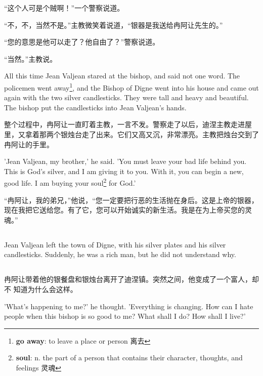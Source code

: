 \documentclass[fontset=ubuntu, zihao=5]{ctexart}
\begin{document}
\begin{paracol}{2}
  “这个人可是个贼啊！”一个警察说道。

  “不，不，当然不是。”主教微笑着说道，“银器是我送给冉阿让先生的。”

  “您的意思是他可以走了？他自由了？”警察说道。

  “当然。”主教说。

  \switchcolumn*

  All this time Jean Valjean stared at the bishop, and said not one word. The policemen went away\footnote{\textbf{go away}: to leave a place or person 离去}, and the Bishop of Digne went into his house and came out again with the two silver candlesticks. They were tall and heavy and beautiful. The bishop put the candlesticks into Jean Valjean's hands.

  \switchcolumn
  整个过程中，冉阿让一直盯着主教，一言不发。警察走了以后，迪涅主教走进屋里，又拿着那两个银烛台走了出来。它们又高又沉，非常漂亮。主教把烛台交到了冉阿让的手里。

  \switchcolumn*

  'Jean Valjean, my brother,' he said. 'You must leave your bad life behind you. This is God's silver, and I am giving it to you. With it, you can begin a new, good life. I am buying your soul\footnote{\textbf{soul}: n. the part of a person that contains their character, thoughts, and feelings 灵魂} for God.'

  \switchcolumn
  “冉阿让，我的弟兄，”他说，“您一定要把行恶的生活抛在身后。这是上帝的银器，现在我把它送给您。有了它，您可以开始诚实的新生活。我是在为上帝买您的灵魂。”

  \switchcolumn*

  \subsection{}

  Jean Valjean left the town of Digne, with his silver plates and his silver candlesticks. Suddenly, he was a rich man, but he did not understand why.

  \switchcolumn

  \subsection*{}

  冉阿让带着他的银餐盘和银烛台离开了迪涅镇。突然之间，他变成了一个富人，却不
  知道为什么会这样。

  \switchcolumn*

  'What's happening to me?' he thought. 'Everything is changing. How can I hate people when this bishop is so good to me? What shall I do? How shall I live?'


\end{paracol}
\end{document}

